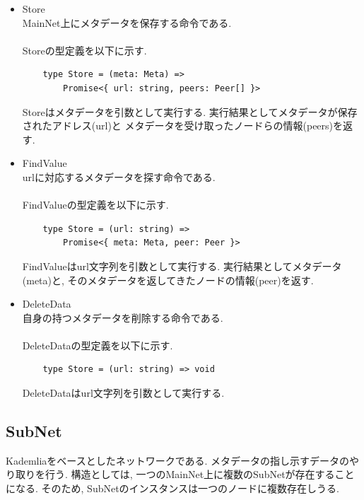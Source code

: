 \documentclass[sotsuron]{jcsie}
\begin{document}
\begin{itemize}
	\item {Store}\\
	      MainNet上にメタデータを保存する命令である.
	      \\\\
	      Storeの型定義を以下に示す.
	      \begin{lstlisting}
	type Store = (meta: Meta) => 
		Promise<{ url: string, peers: Peer[] }>
	      \end{lstlisting}
	      	      
	      Storeはメタデータを引数として実行する.
	      実行結果としてメタデータが保存されたアドレス(url)と
	      メタデータを受け取ったノードらの情報(peers)を返す.
	      \\
	\item {FindValue}\\
	      urlに対応するメタデータを探す命令である.
	      \\\\
	      FindValueの型定義を以下に示す.
	      \begin{lstlisting}
	type Store = (url: string) => 
		Promise<{ meta: Meta, peer: Peer }>
	      \end{lstlisting}
	      	      
	      FindValueはurl文字列を引数として実行する.
	      実行結果としてメタデータ(meta)と, 
	      そのメタデータを返してきたノードの情報(peer)を返す.
	      \\
	\item {DeleteData}\\
	      自身の持つメタデータを削除する命令である.
	      \\\\
	      DeleteDataの型定義を以下に示す.
	      \begin{lstlisting}
	type Store = (url: string) => void
	      \end{lstlisting}
	      	      
	      DeleteDataはurl文字列を引数として実行する.
\end{itemize}

\subsection{SubNet}
Kademliaをベースとしたネットワークである.
メタデータの指し示すデータのやり取りを行う.
構造としては, 一つのMainNet上に複数のSubNetが存在することになる.
そのため, SubNetのインスタンスは一つのノードに複数存在しうる.
\end{document}
